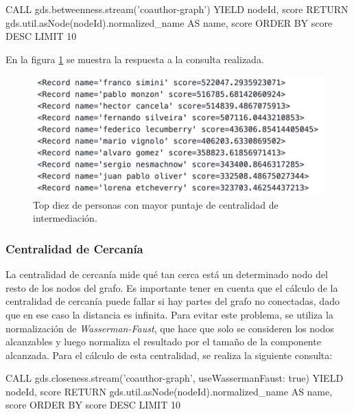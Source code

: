 \documentclass[journal]{IEEEtran}
\begin{document}
\begin{sflisting}[style=sparql,caption= Centralidad de Intermediación,label=intermediacion]
	CALL gds.betweenness.stream('coauthor-graph')
	YIELD nodeId, score
	RETURN gds.util.asNode(nodeId).normalized_name
	AS name, score
	ORDER BY score DESC
	LIMIT 10
\end{sflisting}

En la figura \ref{fig:intermediacion} se muestra la respuesta a la consulta realizada.

\begin{figure}[t]
	\centering
	\includegraphics[width=\linewidth]{imagenes/intermediacion.png}
	\caption{Top diez de personas con mayor puntaje de centralidad de intermediación.}
	\label{fig:intermediacion}
\end{figure}

\subsubsection{Centralidad de Cercanía}
La centralidad de cercanía mide qué tan cerca está un determinado nodo del resto de los nodos del grafo. Es importante tener en cuenta que el cálculo de la centralidad de cercanía puede fallar si hay partes del grafo no conectadas, dado que en ese caso la distancia es infinita. Para evitar este problema, se utiliza la normalización de \textit{Wasserman-Faust}, que hace que solo se consideren los nodos alcanzables y luego normaliza el resultado por el tamaño de la componente alcanzada. Para el cálculo de esta centralidad, se realiza la siguiente consulta:

\begin{sflisting}[style=sparql,caption= Centralidad de Cercanía,label=cercania]
	CALL gds.closeness.stream('coauthor-graph',
	{useWassermanFaust: true})
	YIELD nodeId, score
	RETURN gds.util.asNode(nodeId).normalized_name
	AS name, score
	ORDER BY score DESC
	LIMIT 10
\end{sflisting}
\end{document}
